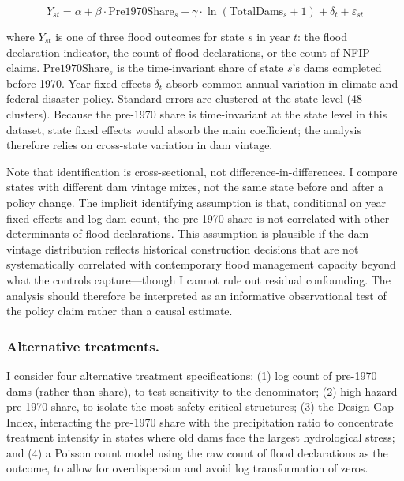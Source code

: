 \documentclass[12pt]{article}
\begin{document}
\begin{equation}
Y_{st} = \alpha + \beta \cdot \text{Pre1970Share}_s + \gamma \cdot \ln(\text{TotalDams}_s + 1) + \delta_t + \varepsilon_{st}
\label{eq:main}
\end{equation}

where $Y_{st}$ is one of three flood outcomes for state $s$ in year $t$: the flood declaration indicator, the count of flood declarations, or the count of NFIP claims. $\text{Pre1970Share}_s$ is the time-invariant share of state $s$'s dams completed before 1970. Year fixed effects $\delta_t$ absorb common annual variation in climate and federal disaster policy. Standard errors are clustered at the state level (48 clusters). Because the pre-1970 share is time-invariant at the state level in this dataset, state fixed effects would absorb the main coefficient; the analysis therefore relies on cross-state variation in dam vintage.

Note that identification is cross-sectional, not difference-in-differences. I compare states with different dam vintage mixes, not the same state before and after a policy change. The implicit identifying assumption is that, conditional on year fixed effects and log dam count, the pre-1970 share is not correlated with other determinants of flood declarations. This assumption is plausible if the dam vintage distribution reflects historical construction decisions that are not systematically correlated with contemporary flood management capacity beyond what the controls capture---though I cannot rule out residual confounding. The analysis should therefore be interpreted as an informative observational test of the policy claim rather than a causal estimate.

\subsubsection*{Alternative treatments.}

I consider four alternative treatment specifications: (1) log count of pre-1970 dams (rather than share), to test sensitivity to the denominator; (2) high-hazard pre-1970 share, to isolate the most safety-critical structures; (3) the Design Gap Index, interacting the pre-1970 share with the precipitation ratio to concentrate treatment intensity in states where old dams face the largest hydrological stress; and (4) a Poisson count model using the raw count of flood declarations as the outcome, to allow for overdispersion and avoid log transformation of zeros.
\end{document}
